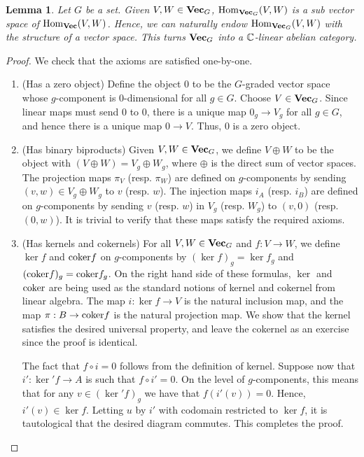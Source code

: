 \documentclass{article}
\newtheorem{lemma}{Lemma}[section]
\theoremstyle{definition}
\numberwithin{figure}{section}
\begin{document}
\begin{lemma} Let $G$ be a set. Given $V,W\in \bold{Vec}_G$, $\mathrm{Hom}_{\bold{Vec}_G}(V,W)$ is a sub vector space of $\mathrm{Hom}_{\bold{Vec}}(V,W)$. Hence, we can naturally endow $\mathrm{Hom}_{\bold{Vec}_G}(V,W)$ with the structure of a vector space. This turns $\bold{Vec}_G$ into a $\mathbb{C}$-linear abelian category.
\end{lemma}
\begin{proof} We check that the axioms are satisfied one-by-one.

\begin{enumerate}

\item (Has a zero object) Define the object $0$ to be the $G$-graded vector space whose $g$-component is $0$-dimensional for all $g\in G$. Choose $V\in \bold{Vec}_G$. Since linear maps must send $0$ to $0$, there is a unique map $0_g\to V_g$ for all $g\in G$, and hence there is a unique map $0\to V$. Thus, $0$ is a zero object.

\item (Has binary biproducts) Given $V,W\in \bold{Vec}_G$, we define $V\oplus W$ to be the object with $(V\oplus W)=V_g\oplus W_g$, where $\oplus$ is the direct sum of vector spaces. The projection maps $\pi_V$ (resp. $\pi_W$) are defined on $g$-components by sending $(v,w)\in V_g\oplus W_g$ to $v$ (resp. $w$). The injection maps $i_A$ (resp. $i_B$) are defined on $g$-components by sending $v$ (resp. $w$) in $V_g$ (resp. $W_g$) to $(v,0)$ (resp. $(0,w)$). It is trivial to verify that these maps satisfy the required axioms.

\item (Has kernels and cokernels) For all $V,W\in \bold{Vec}_G$ and $f:V\to W$, we define $\ker f$ and $\mathrm{coker} f$ on $g$-components by $(\ker f)_g=\ker f_g$ and $(\mathrm{coker} f)_g=\mathrm{coker} f_g$. On the right hand side of these formulas, $\ker$ and $\mathrm{coker}$ are being used as the standard notions of kernel and cokernel from linear algebra. The map $i: \ker f\to V$ is the natural inclusion map, and the map $\pi:B\to \mathrm{coker} f$ is the natural projection map. We show that the kernel satisfies the desired universal property, and leave the cokernel as an exercise since the proof is identical.

The fact that $f\circ i=0$ follows from the definition of kernel. Suppose now that $i':\ker' f\to A$ is such that $f\circ i'=0$. On the level of $g$-components, this means that for any $v\in (\ker' f)_g$ we have that $f(i'(v))=0$. Hence, $i'(v)\in \ker f$. Letting $u$ by $i'$ with codomain restricted to $\ker f$, it is tautological that the desired diagram commutes. This completes the proof.


\end{enumerate}
\end{proof}
\end{document}

